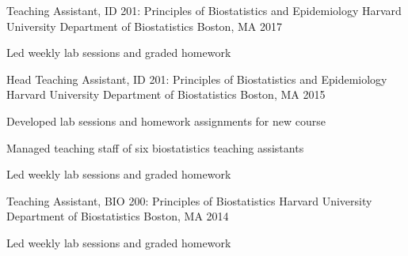 

\begin{cventries}

  \cventry
    {Teaching Assistant, ID 201: Principles of Biostatistics and Epidemiology} %
    {Harvard University Department of Biostatistics} %
    {Boston, MA} %
    {2017} %
    {
      \begin{cvitems} %
        \item {Led weekly lab sessions and graded homework}
      \end{cvitems}
    }

  \cventry
    {Head Teaching Assistant, ID 201: Principles of Biostatistics and Epidemiology} %
    {Harvard University Department of Biostatistics} %
    {Boston, MA} %
    {2015} %
    {
      \begin{cvitems} %
        \item {Developed lab sessions and homework assignments for new course}
        \item {Managed teaching staff of six biostatistics teaching assistants}
        \item {Led weekly lab sessions and graded homework}
      \end{cvitems}
    }

  \cventry
    {Teaching Assistant, BIO 200: Principles of Biostatistics} %
    {Harvard University Department of Biostatistics} %
    {Boston, MA} %
    {2014} %
    {
      \begin{cvitems} %
        \item {Led weekly lab sessions and graded homework}
      \end{cvitems}
    }
\end{cventries}
